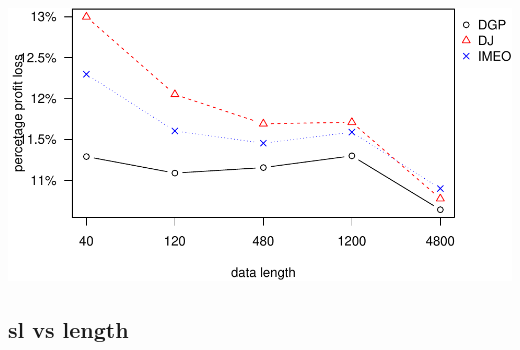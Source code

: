 \documentclass[
]{article}
\begin{document}
\includegraphics{runif_non-plot_files/figure-latex/ppl-1.pdf}

\hypertarget{sl-vs-length}{%
\subsection{sl vs length}\label{sl-vs-length}}
\end{document}
